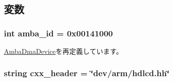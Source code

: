 \subsection{変数}
\hypertarget{classRealView_1_1HDLcd_a38d7b9edfe6f0eea7a54e7e4f6253f3a}{
\subsubsection[{amba\_\-id}]{\setlength{\rightskip}{0pt plus 5cm}int {\bf amba\_\-id} = 0x00141000}}
\label{classRealView_1_1HDLcd_a38d7b9edfe6f0eea7a54e7e4f6253f3a}


\hyperlink{classRealView_1_1AmbaDmaDevice_ad9d2b9e37de5c1c7c10219fc1b834599}{AmbaDmaDevice}を再定義しています。\hypertarget{classRealView_1_1HDLcd_a17da7064bc5c518791f0c891eff05fda}{
\subsubsection[{cxx\_\-header}]{\setlength{\rightskip}{0pt plus 5cm}string {\bf cxx\_\-header} = \char`\"{}dev/arm/hdlcd.hh\char`\"{}}}
\label{classRealView_1_1HDLcd_a17da7064bc5c518791f0c891eff05fda}


